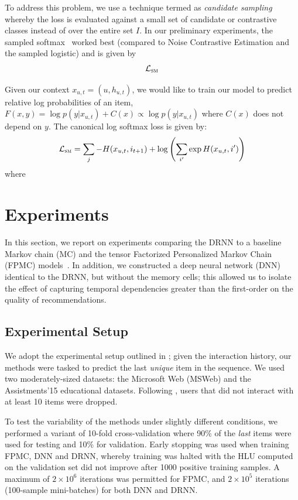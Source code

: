 \documentclass{sig-alternate-05-2015}
\begin{document}
To address this problem, we use a technique termed as \emph{candidate sampling}~\cite{TFCandidateSampling} whereby the loss is evaluated against a small set of candidate or contrastive classes instead of over the entire set $I$. In our preliminary experiments, the sampled softmax~\cite{Jean2015} worked best (compared to Noise Contrastive Estimation and the sampled logistic) and is given by
\begin{align}
	\mathcal{L}_{\textsc{sm}}
\end{align}

Given our context $x_{u,t} = (u, h_{u,t})$, we would like to train our model to predict relative log probabilities of an item, $F(x,y) = \log p(y|x_{u,t}) + C(x) \propto \log p(y|x_{u,t})$ where $C(x)$ does not depend on $y$. The canonical log softmax loss is given by:
\begin{align}
	\mathcal{L}_{\textsc{sm}} = \sum_j -H(x_{u,t}, i_{t+1}) + \log \left( \sum_{i'} \exp H(x_{u,t}, i') \right)
\end{align}
where 


\section{Experiments}
In this section, we report on experiments comparing the DRNN to a baseline Markov chain (MC) and the tensor Factorized Personalized Markov Chain (FPMC) models~\cite{Rendle2010}. In addition, we constructed a deep neural network (DNN) identical to the DRNN, but without the memory cells; this allowed us to isolate the effect of capturing temporal dependencies greater than the first-order on the quality of recommendations.

\subsection{Experimental Setup}
We adopt the experimental setup outlined in \cite{Rendle2010}; given the interaction history, our methods were tasked to predict the last \emph{unique} item in the sequence. We used two moderately-sized datasets: the Microsoft Web (MSWeb) and the Assistments'15 educational datasets. Following \cite{Rendle2010}, users that did not interact with at least 10 items were dropped. 

To test the variability of the methods under slightly different conditions, we performed a variant of 10-fold cross-validation where 90\% of the \emph{last} items were used for testing and 10\% for validation. Early stopping was used when training FPMC, DNN and DRNN, whereby training was halted with the HLU computed on the validation set did not improve after 1000 positive training samples. A maximum of $2\times 10^6$ iterations was permitted for FPMC, and $2\times 10^5$ iterations (100-sample mini-batches) for both DNN and DRNN. 
\end{document}
